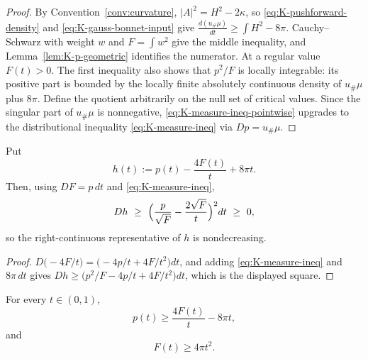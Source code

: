 \begin{proof}
By Convention~\ref{conv:curvature}, $|A|^2=H^2-2\kappa$, so
\eqref{eq:K-pushforward-density} and \eqref{eq:K-gauss-bonnet-input} give
$\frac{d(u_\#\mu)}{dt}\ge\int H^2-8\pi$.  Cauchy--Schwarz with weight $w$ and
$F=\int w^2$ give the middle inequality, and
Lemma~\ref{lem:K-p-geometric} identifies the numerator.  At a regular value
$F(t)>0$.  The first inequality also shows that $p^2/F$ is locally integrable:
its positive part is bounded by the locally finite absolutely continuous
density of $u_\#\mu$ plus $8\pi$.  Define the quotient arbitrarily on the null
set of critical values.  Since the singular
part of $u_\#\mu$ is nonnegative, \eqref{eq:K-measure-ineq-pointwise} upgrades
to the distributional inequality \eqref{eq:K-measure-ineq} via
$Dp=u_\#\mu$.
\end{proof}

\begin{lemma}\label{lem:K-h-monotone}
Put
\begin{equation}\label{eq:K-h}
  h(t):=p(t)-\frac{4F(t)}{t}+8\pi t .
\end{equation}
Then, using $DF=p\,dt$ and \eqref{eq:K-measure-ineq},
\begin{equation}\label{eq:K-Dh}
  Dh\ \ge\ \Bigl(\frac{p}{\sqrt F}-\frac{2\sqrt F}{t}\Bigr)^2dt\ \ge\ 0 ,
\end{equation}
so the right-continuous representative of $h$ is nondecreasing.
\end{lemma}

\begin{proof}
$D\bigl(-4F/t\bigr)=\bigl(-4p/t+4F/t^2\bigr)dt$, and adding
\eqref{eq:K-measure-ineq} and $8\pi\,dt$ gives
$Dh\ge\bigl(p^2/F-4p/t+4F/t^2\bigr)dt$, which is the displayed square.
\end{proof}

\begin{proposition}\label{prop:K-two-ineq}
For every $t\in(0,1)$,
\begin{equation}\label{eq:K-p-bound}
  p(t)\ge\frac{4F(t)}{t}-8\pi t ,
\end{equation}
and
\begin{equation}\label{eq:K-F-bound}
  F(t)\ge4\pi t^2 .
\end{equation}
\end{proposition}

